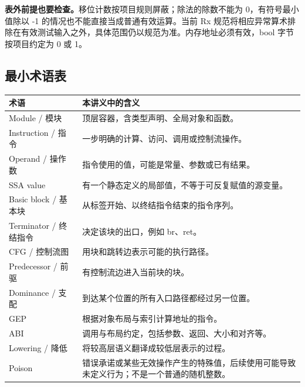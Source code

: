 \textbf{表外前提也要检查。}移位计数按项目规则屏蔽；除法的除数不能为 0，有符号最小值除以 -1 的情况也不能直接当成普通有效运算。当前 Rx 规范将相应异常算术排除在有效测试输入之外，具体范围仍以规范为准。内存地址必须有效，bool 字节按项目约定为 0 或 1。

\subsection{最小术语表}
\begin{tabularx}{\linewidth}{@{}p{43mm}Y@{}}
\toprule
术语 & 本讲义中的含义 \\
\midrule
Module / 模块 & 顶层容器，含类型声明、全局对象和函数。\\
Instruction / 指令 & 一步明确的计算、访问、调用或控制流操作。\\
Operand / 操作数 & 指令使用的值，可能是常量、参数或已有结果。\\
SSA value & 有一个静态定义的局部值，不等于可反复赋值的源变量。\\
Basic block / 基本块 & 从标签开始、以终结指令结束的指令序列。\\
Terminator / 终结指令 & 决定该块的出口，例如 br、ret。\\
CFG / 控制流图 & 用块和跳转边表示可能的执行路径。\\
Predecessor / 前驱 & 有控制流边进入当前块的块。\\
Dominance / 支配 & 到达某个位置的所有入口路径都经过另一位置。\\
GEP & 根据对象布局与索引计算地址的指令。\\
ABI & 调用与布局约定，包括参数、返回、大小和对齐等。\\
Lowering / 降低 & 将较高层语义翻译成较低层表示的过程。\\
Poison & 错误承诺或某些无效操作产生的特殊值，后续使用可能导致未定义行为；不是一个普通的随机整数。\\
\bottomrule
\end{tabularx}

